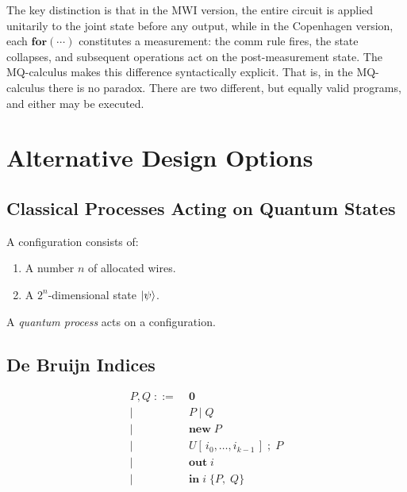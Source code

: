 \documentclass[11pt]{article}
\begin{document}
\medskip
\noindent
The key distinction is that in the MWI version, the entire circuit is
applied unitarily to the joint state before any output, while in the
Copenhagen version, each $\mathbf{for}(\cdots)$ constitutes a
measurement: the comm rule fires, the state collapses, and subsequent
operations act on the post-measurement state.  The MQ-calculus makes
this difference syntactically explicit. That is, in the MQ-calculus
there is no paradox. There are two different, but equally valid
programs, and either may be executed.

\section{Alternative Design Options}

\subsection{Classical Processes Acting on Quantum States}

A configuration consists of:
\begin{enumerate}
  \item A number $n$ of allocated wires.
  \item A $2^n$-dimensional state $\ket{\psi}$.
\end{enumerate}

A \emph{quantum process} acts on a configuration.

\subsection{De Bruijn Indices}

\begin{align*}
  P, Q \;::=\; & \mathbf{0} \\
    \mid\; & P \mid Q \\
    \mid\; & \mathbf{new}\; P \\
    \mid\; & U[\,i_0, \ldots, i_{k-1}\,]\;;\; P \\
    \mid\; & \mathbf{out}\; i \\
    \mid\; & \mathbf{in}\; i\;\{P,\; Q\}
\end{align*}
\end{document}
